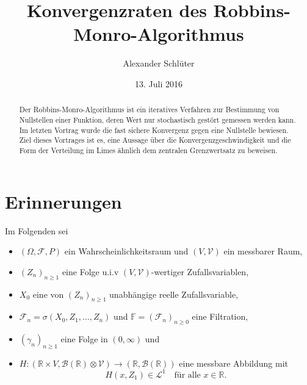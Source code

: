 \documentclass[ngerman,a4paper,11pt]{scrartcl}
\newcommand{\FF}{\mathbb{F}}
\newcommand{\RR}{\mathbb{R}}
\newcommand{\bb}{\mathcal{B}}
\newcommand{\ff}{\mathcal{F}}
\renewcommand{\ll}{\mathcal{L}}
\newcommand{\vv}{\mathcal{V}}
\newcommand{\zspace}{V}
\newcommand{\zsigma}{\vv}
\newcommand{\interv}{\RR}
\begin{document}
\title{Konvergenzraten des Robbins-Monro-Algorithmus}
\author{Alexander Schlüter}
\date{13. Juli 2016}
\maketitle
\begin{abstract}
  Der Robbins-Monro-Algorithmus ist ein iteratives Verfahren zur Bestimmung von
  Nullstellen einer Funktion, deren Wert nur stochastisch gestört gemessen
  werden kann. Im letzten Vortrag wurde die fast sichere Konvergenz gegen eine
  Nullstelle bewiesen. Ziel dieses Vortrages ist es, eine Aussage über die
  Konvergenzgeschwindigkeit und die Form der Verteilung im Limes ähnlich dem
  zentralen Grenzwertsatz zu beweisen.
\end{abstract}
\tableofcontents

\section{Erinnerungen}
Im Folgenden sei    
\begin{itemize}
\item $(\Omega, \ff, P)$ ein Wahrscheinlichkeitsraum und $(\zspace,\zsigma)$ ein messbarer Raum,
\item $(Z_n)_{n\geq 1}$ eine Folge u.i.v $(\zspace, \zsigma)$-wertiger Zufallsvariablen,
\item $X_0$ eine von $(Z_n)_{n\geq 1}$ unabhängige reelle Zufallsvariable,
\item $\ff_n=\sigma(X_0,Z_1,\dotsc,Z_n)$ und $\FF=(\ff_n)_{n\geq 0}$ eine Filtration,
\item $(\gamma_n)_{n\geq 1}$ eine Folge in $(0,\infty)$ und
\item $H:(\interv\times \zspace,\bb(\interv)\otimes\zsigma)\to(\RR,\bb(\RR))$ eine messbare
  Abbildung mit
  \begin{equation*}
    H(x,Z_1)\in\ll^1\quad\text{für alle $x\in \interv$.}
  \end{equation*}
\end{itemize}
\end{document}
